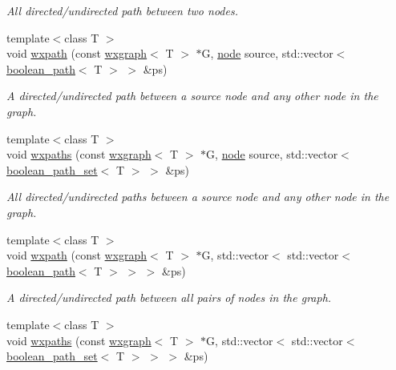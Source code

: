 \begin{DoxyCompactItemize}
\begin{DoxyCompactList}\small\item\em All directed/undirected path between two nodes. \end{DoxyCompactList}\item 
{\footnotesize template$<$class T $>$ }\\void \hyperlink{namespacelgraph_1_1traversal_a493f120f7abd50cc8c2edc914199ef3d}{wxpath} (const \hyperlink{classlgraph_1_1wxgraph}{wxgraph}$<$ T $>$ $\ast$G, \hyperlink{namespacelgraph_a397169dd66adf725210a30fb7251773e}{node} source, std\+::vector$<$ \hyperlink{classlgraph_1_1boolean__path}{boolean\+\_\+path}$<$ T $>$ $>$ \&ps)
\begin{DoxyCompactList}\small\item\em A directed/undirected path between a source node and any other node in the graph. \end{DoxyCompactList}\item 
{\footnotesize template$<$class T $>$ }\\void \hyperlink{namespacelgraph_1_1traversal_a44125e6be3246de94b8c0a0ef7e15926}{wxpaths} (const \hyperlink{classlgraph_1_1wxgraph}{wxgraph}$<$ T $>$ $\ast$G, \hyperlink{namespacelgraph_a397169dd66adf725210a30fb7251773e}{node} source, std\+::vector$<$ \hyperlink{namespacelgraph_afad432931ba600ab1628d5c9595986c5}{boolean\+\_\+path\+\_\+set}$<$ T $>$ $>$ \&ps)
\begin{DoxyCompactList}\small\item\em All directed/undirected paths between a source node and any other node in the graph. \end{DoxyCompactList}\item 
{\footnotesize template$<$class T $>$ }\\void \hyperlink{namespacelgraph_1_1traversal_aec3005313c7f91c77e0f491856ddea71}{wxpath} (const \hyperlink{classlgraph_1_1wxgraph}{wxgraph}$<$ T $>$ $\ast$G, std\+::vector$<$ std\+::vector$<$ \hyperlink{classlgraph_1_1boolean__path}{boolean\+\_\+path}$<$ T $>$ $>$ $>$ \&ps)
\begin{DoxyCompactList}\small\item\em A directed/undirected path between all pairs of nodes in the graph. \end{DoxyCompactList}\item 
{\footnotesize template$<$class T $>$ }\\void \hyperlink{namespacelgraph_1_1traversal_aa9f18da0801c5d0401b1be463032d22c}{wxpaths} (const \hyperlink{classlgraph_1_1wxgraph}{wxgraph}$<$ T $>$ $\ast$G, std\+::vector$<$ std\+::vector$<$ \hyperlink{namespacelgraph_afad432931ba600ab1628d5c9595986c5}{boolean\+\_\+path\+\_\+set}$<$ T $>$ $>$ $>$ \&ps)

\end{DoxyCompactItemize}
